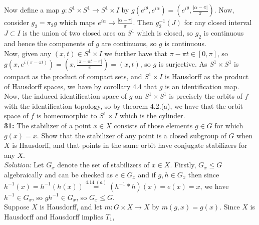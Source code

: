 \documentclass[a4paper]{article}
\begin{document}
        Now define a map
        $g  \colon S^{1} \times S^{1} \to S^{1} \times I$ by
        $g\left( e^{i \theta}, e^{i \alpha} \right) 
        = \left( e^{i \theta}, \frac{\left| \alpha - \pi \right| }{\pi} \right)
        $. Now, consider
        $g_2 = \pi_2 g$ which maps $e^{i \alpha} \to \frac{\left| \alpha - \pi
        \right| }{\pi}$. Then
        $g_2^{-1}(J)$ for any closed interval $J \subset I$ is the union of two closed
        arcs on $S^{1}$ which is closed, so $g_2$ is continuous and hence
        the components of $g$ are continuous, so $g$ is continuous.\\
        Now, given any $(x, t) \in S^{1} \times I$ we further have
        that  $\pi - \pi t \in \left[ 0, \pi \right] $, so
        $g\left( x, e^{i \left( \pi - \pi t \right) } \right) 
        = \left( x, \frac{\left| \pi - \pi t - \pi \right| }{\pi} \right) 
        = \left( x, t \right) $, so $g$ is surjective. As
        $S^{1} \times S^{1}$ is compact as the product of compact sets,
        and $S^{1} \times I$ is Hausdorff as the product of Hausdorff spaces,
        we have by corollary 4.4 that $g$ is an identification map.\\
        \linebreak
        Now, the induced identification space of $g$ on $S^{1} \times S^{1}$ is precisely
        the orbits of $f$ with the identification topology, so by theorem 4.2.(a), we have that
        the orbit space of  $f$ is homeomorphic to
        $S^{1} \times I$ which is the cylinder.\\
        \linebreak
        \textbf{31:} The stabilizer of a point $x \in X$ consists of those
        elements $g \in G$ for which $g(x) = x$. Show that the stabilizer of
        any point is a closed subgroup of $G$ when $X$ is Hausdorff, and that
        points in the same orbit have conjugate stabilizers for any $X$.\\
        \linebreak
        \textit{Solution:} Let $G_x$ denote the set of stabilizers of
        $x \in X$. Firstly, $G_x \le G$ algebraically and can be checked as
        $e \in G_x$ and if $g,h \in G_x$ then
        since $h^{-1}(x) =  h^{-1} (h (x))
        \stackrel{4.14.(a)}{=} (h^{-1}*h) (x)= e (x) = x$, we have
        $h^{-1} \in G_x$, so
        $gh^{-1} \in G_x$, so $G_x \le G$.\\
        Suppose $X$ is Hausdorff, and let
        $m  \colon G \times X \to X$ by
        $m(g,x) = g(x)$. Since $X$ is Hausdorff and Hausdorff implies $T_1$,
\end{document}
